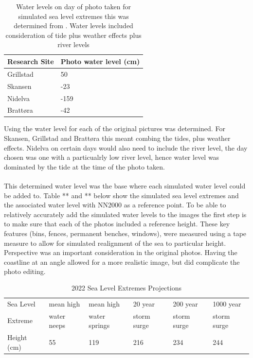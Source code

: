 \begin{table}[h]
    \centering
    \begin{tabular}{|l|l|}
        \hline
     	Research Site & Photo water level (cm) \\ \hline
            Grillstad & 50 \\ \hline
            Skansen & -23 \\ \hline
            Nidelva & -159 \\ \hline
            Brattøra	& -42 \\ \hline
    \end{tabular}
    \caption{Water levels on day of photo taken for simulated sea level extremes this was determined from \cite{tides_high_2022}. Water levels included consideration of tide plus weather effects plus river levels}
    \label{tab:water_level_photo}
\end{table}

Using \cite{tides_high_2022}the water level for each of the original pictures was determined. For Skansen, Grillstad and Brattøra this meant combing the tides, plus weather effects. Nidelva on certain days would also need to include the river level, the day chosen was one with a particualrly low river level, hence water level was dominated by the tide at the time of the photo taken.   
\paragraph{}

This determined water level was the base where each simulated water level could be added to. Table ** and ** below show the simulated sea level extremes and the associated water level with NN2000 as a reference point.  To be able to relatively accurately add the simulated water levels to the images the first step is to make sure that each of the photos included a reference height. These key features (bins, fences, permanent benches, windows), were measured using a tape measure to allow for simulated realignment of the sea to particular height. Perspective was an important consideration in the original photos. Having the coastline at an angle allowed for a more realistic image, but did complicate the photo editing. 

\begin{table}[h]
    \centering
    \begin{tabular}{|l|l|l|l|l|l|}
    \hline
     Sea Level &   mean high  & mean high  & 20 year  & 200 year   & 1000 year  \\ \newline
     Extreme &  water neeps & water springs &  storm surge  & storm surge  &  storm surge  \\ \hline
       Height (cm) &  55 & 119 & 216 & 234 & 244 \\ \hline
    \end{tabular}
    \caption{2022 Sea Level Extremes Projections}
    \label{2022_sle_projections}
\end{table}

